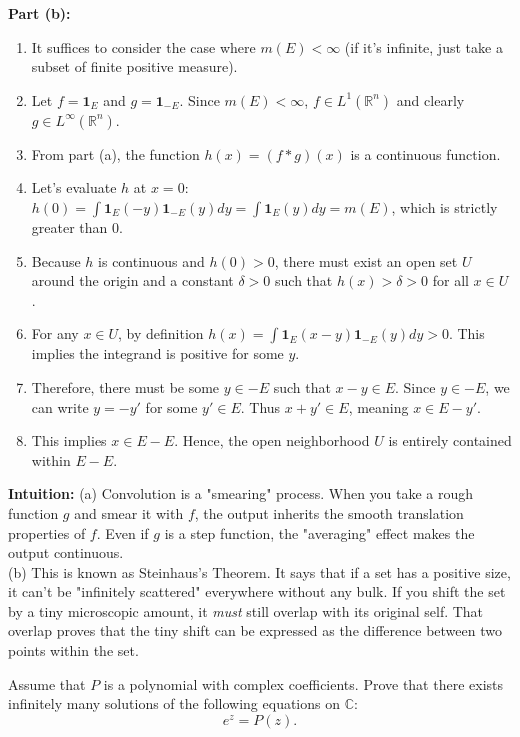 \begin{solution}
\textbf{Part (b):}
\begin{enumerate}
    \item It suffices to consider the case where $m(E) < \infty$ (if it's infinite, just take a subset of finite positive measure).
    \item Let $f = \mathbf{1}_E$ and $g = \mathbf{1}_{-E}$. Since $m(E) < \infty$, $f \in L^1(\mathbb{R}^n)$ and clearly $g \in L^\infty(\mathbb{R}^n)$.
    \item From part (a), the function $h(x) = (f * g)(x)$ is a continuous function.
    \item Let's evaluate $h$ at $x=0$: $h(0) = \int \mathbf{1}_E(-y)\mathbf{1}_{-E}(y) dy = \int \mathbf{1}_E(y) dy = m(E)$, which is strictly greater than $0$.
    \item Because $h$ is continuous and $h(0) > 0$, there must exist an open set $U$ around the origin and a constant $\delta > 0$ such that $h(x) > \delta > 0$ for all $x \in U$.
    \item For any $x \in U$, by definition $h(x) = \int \mathbf{1}_E(x-y)\mathbf{1}_{-E}(y) dy > 0$. This implies the integrand is positive for some $y$.
    \item Therefore, there must be some $y \in -E$ such that $x-y \in E$. Since $y \in -E$, we can write $y = -y'$ for some $y' \in E$. Thus $x + y' \in E$, meaning $x \in E - y'$.
    \item This implies $x \in E - E$. Hence, the open neighborhood $U$ is entirely contained within $E-E$.
\end{enumerate}

\textbf{Intuition:}
(a) Convolution is a "smearing" process. When you take a rough function $g$ and smear it with $f$, the output inherits the smooth translation properties of $f$. Even if $g$ is a step function, the "averaging" effect makes the output continuous.\\[2ex]
(b) This is known as Steinhaus's Theorem. It says that if a set has a positive size, it can't be "infinitely scattered" everywhere without any bulk. If you shift the set by a tiny microscopic amount, it \textit{must} still overlap with its original self. That overlap proves that the tiny shift can be expressed as the difference between two points within the set.
\end{solution}

\begin{exercise}
\label{analysis:2021:4}
Assume that $P$ is a polynomial with complex coefficients. Prove that there exists infinitely many solutions of the following equations on $\mathbb{C}$:
\[
e^z = P(z).
\]
\end{exercise}

